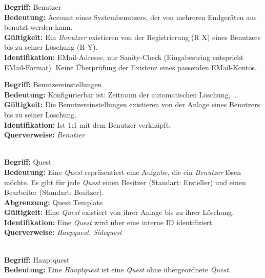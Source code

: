 \documentclass{article}
\begin{document}
\begin{samepage}
\textbf{Begriff:} Benutzer \\
\textbf{Bedeutung:} Account eines Systembenutzers, der von mehreren Endgeräten aus benutzt werden kann. \\
\textbf{Gültigkeit:} Ein \textit{Benutzer} existieren von der Registrierung (R X) eines Benutzers bis zu seiner Löschung (R Y). \\
\textbf{Identifikation:} EMail-Adresse, nur Sanity-Check (Eingabestring entspricht EMail-Format). Keine Überprüfung der Existenz eines passenden EMail-Kontos. \\
\end{samepage}

\begin{samepage}
\textbf{Begriff:} Benutzereinstellungen \\
\textbf{Bedeutung:} Konfigurierbar ist: Zeitraum der automatischen Löschung, ... \\
\textbf{Gültigkeit:} Die Benutzereinstellungen existieren von der Anlage eines Benutzers bis zu seiner Löschung. \\
\textbf{Identifikation:} Ist 1:1 mit dem Benutzer verknüpft. \\
\textbf{Querverweise:} \textit{Benutzer} \\ \\
\end{samepage}

\begin{samepage}
\textbf{Begriff:} Quest \\
\textbf{Bedeutung:} Eine \textit{Quest} repräsentiert eine Aufgabe, die ein \textit{Benutzer} lösen möchte. Es gibt für jede \textit{Quest} einen Besitzer (Standart: Ersteller) und einen Bearbeiter (Standart: Besitzer). \\
\textbf{Abgrenzung:} Quest Template \\
\textbf{Gültigkeit:} Eine \textit{Quest} existiert von ihrer Anlage bis zu ihrer Löschung. \\
\textbf{Identifikation:} Eine \textit{Quest} wird über eine interne ID identifiziert. \\
\textbf{Querverweise:} \textit{Haupquest}, \textit{Sidequest} \\ \\
\end{samepage}

\begin{samepage}
\textbf{Begriff:} Hauptquest \\
\textbf{Bedeutung:} Eine \textit{Hauptquest} ist eine \textit{Quest} ohne übergeordnete \textit{Quest}. \\
\end{samepage}
\end{document}
